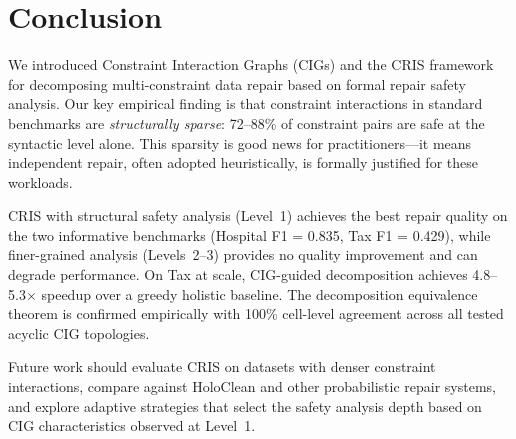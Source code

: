 \documentclass{article}
\newcommand{\cris}{\textsc{CRIS}\xspace}
\begin{document}
\section{Conclusion}
\label{sec:conclusion}

We introduced Constraint Interaction Graphs (CIGs) and the \cris framework for decomposing multi-constraint data repair based on formal repair safety analysis. Our key empirical finding is that constraint interactions in standard benchmarks are \emph{structurally sparse}: 72--88\% of constraint pairs are safe at the syntactic level alone. This sparsity is good news for practitioners---it means independent repair, often adopted heuristically, is formally justified for these workloads.

\cris with structural safety analysis (Level~1) achieves the best repair quality on the two informative benchmarks (Hospital F1 = 0.835, Tax F1 = 0.429), while finer-grained analysis (Levels~2--3) provides no quality improvement and can degrade performance. On Tax at scale, CIG-guided decomposition achieves 4.8--5.3$\times$ speedup over a greedy holistic baseline. The decomposition equivalence theorem is confirmed empirically with 100\% cell-level agreement across all tested acyclic CIG topologies.

Future work should evaluate \cris on datasets with denser constraint interactions, compare against HoloClean and other probabilistic repair systems, and explore adaptive strategies that select the safety analysis depth based on CIG characteristics observed at Level~1.



\end{document}
